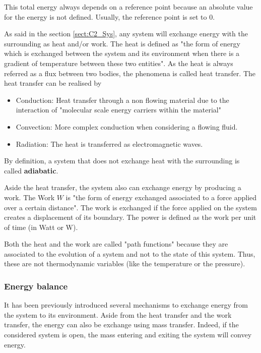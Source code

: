 This total energy always depends on a reference point because an absolute value for the energy is not defined. Usually, the reference point is set to 0.

As said in the section \ref{sect:C2_Sys}, any system will exchange energy with the surrounding as heat and/or work. The heat is defined as "the form of energy which is exchanged between the system and its environment when there is a gradient of temperature between these two entities". As the heat is always referred as a flux between two bodies, the phenomena is called heat transfer. The heat transfer can be realised by
\begin{itemize}
    \item Conduction: Heat transfer through a non flowing material due to the interaction of "molecular scale energy carriers within the material"\cite{GregoryNellis2015}
    \item Convection: More complex conduction when considering a flowing fluid.
    \item Radiation: The heat is transferred as electromagnetic waves.
\end{itemize}

By definition, a system that does not exchange heat with the surrounding is called \textbf{adiabatic}.

Aside the heat transfer, the system also can exchange energy by producing a work. The Work $W$ is "the form of energy exchanged associated to a force applied over a certain distance". The work is exchanged if the force applied on the system creates a displacement of its boundary. The power is defined as the work per unit of time (in Watt or W).

Both the heat and the work are called "path functions" because they are associated to the evolution of a system and not to the state of this system. Thus, these are not thermodynamic variables (like the temperature or the pressure).

\subsubsection{Energy balance}
It has been previously introduced several mechanisms to exchange energy from the system to its environment. Aside from the heat transfer and the work transfer, the energy can also be exchange using mass transfer. Indeed, if the considered system is open, the mass entering and exiting the system will convey energy.

